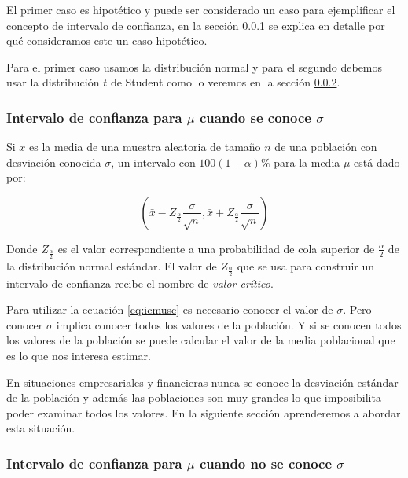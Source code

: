\documentclass[letterpaper,]{book}
\begin{document}
El primer caso es hipotético y puede ser considerado un caso para ejemplificar el concepto de intervalo de confianza, en la sección \ref{jt} se explica en detalle por qué consideramos este un caso hipotético.

Para el primer caso usamos la distribución normal y para el segundo debemos usar la distribución \(t\) de Student como lo veremos en la sección \ref{icsd}.

\hypertarget{jt}{%
\subsubsection{\texorpdfstring{Intervalo de confianza para \(\mu\) cuando se conoce \(\sigma\)}{Intervalo de confianza para \textbackslash{}mu cuando se conoce \textbackslash{}sigma}}\label{jt}}

Si \(\bar{x}\) es la media de una muestra aleatoria de tamaño \(n\) de una población con desviación conocida \(\sigma\), un intervalo con \(100\left(1-\alpha\right)\%\) para la media \(\mu\) está dado por:

\begin{equation} 
  \left(\bar{x} - Z_{\frac{\alpha}{2}}\dfrac{\sigma}{\sqrt{n}}, \bar{x} + Z_{\frac{\alpha}{2}}\dfrac{\sigma}{\sqrt{n}}  \right)
  \label{eq:icmusc}
\end{equation}

Donde \(Z_{\frac{\alpha}{2}}\) es el valor correspondiente a una probabilidad de cola superior de \(\frac{\alpha}{2}\) de la distribución normal estándar. El valor de \(Z_{\frac{\alpha}{2}}\) que se usa para construir un intervalo de confianza recibe el nombre de \emph{valor crítico}.

Para utilizar la ecuación \eqref{eq:icmusc} es necesario conocer el valor de \(\sigma\). Pero conocer \(\sigma\) implica conocer todos los valores de la población. Y si se conocen todos los valores de la población se puede calcular el valor de la media poblacional que es lo que nos interesa estimar.

En situaciones empresariales y financieras nunca se conoce la desviación estándar de la población y además las poblaciones son muy grandes lo que imposibilita poder examinar todos los valores. En la siguiente sección aprenderemos a abordar esta situación.

\hypertarget{icsd}{%
\subsubsection{\texorpdfstring{Intervalo de confianza para \(\mu\) cuando no se conoce \(\sigma\)}{Intervalo de confianza para \textbackslash{}mu cuando no se conoce \textbackslash{}sigma}}\label{icsd}}
\end{document}
